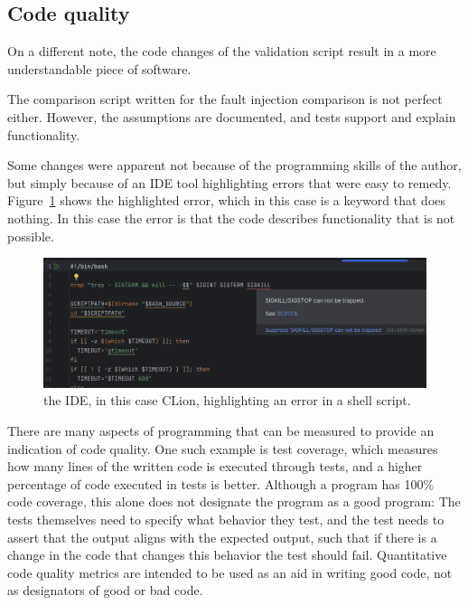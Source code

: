 \subsection{Code quality}

On a different note, the code changes of the validation script result in a more understandable piece of software.

The comparison script written for the fault injection comparison is not perfect either. However, the assumptions are documented, and tests support and explain functionality. 

Some changes were apparent not because of the programming skills of the author, but simply because of an IDE tool highlighting errors that were easy to remedy. Figure~\ref{fig:IDE_highlighting} shows the highlighted error, which in this case is a keyword that does nothing. In this case the error is that the code describes functionality that is not possible.

\begin{figure}[h]
    \centering
    \includegraphics[width=\linewidth]{Images/IDE_highlighting.png}
    \caption{the IDE, in this case CLion, highlighting an error in a shell script.}
    \label{fig:IDE_highlighting}
\end{figure}

There are many aspects of programming that can be measured to provide an indication of code quality. One such example is test coverage, which measures how many lines of the written code is executed through tests, and a higher percentage of code executed in tests is better. Although a program has 100\% code coverage, this alone does not designate the program as a good program: The tests themselves need to specify what behavior they test, and the test needs to assert that the output aligns with the expected output, such that if there is a change in the code that changes this behavior the test should fail. Quantitative code quality metrics are intended to be used as an aid in writing good code, not as designators of good or bad code. 

